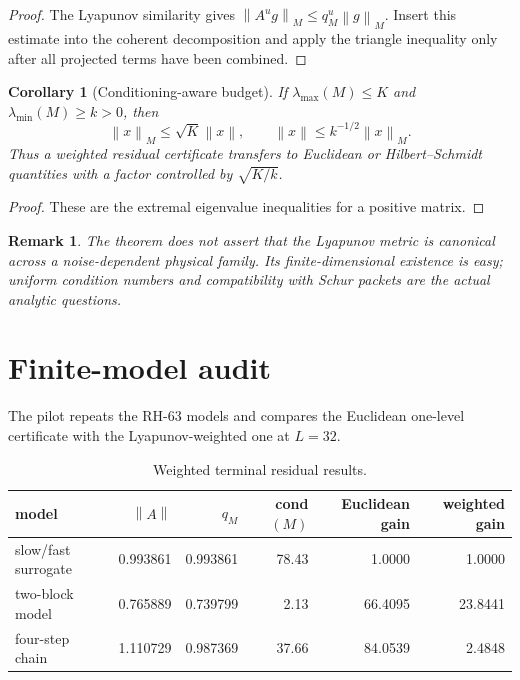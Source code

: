 \documentclass[11pt]{article}
\newtheorem{corollary}[theorem]{Corollary}
\newtheorem{remark}[theorem]{Remark}
\newcommand{\norm}[1]{\left\lVert#1\right\rVert}
\begin{document}
\begin{proof}
The Lyapunov similarity gives
$\norm{A^ug}_M\le q_M^u\norm g_M$.  Insert this estimate into the coherent
decomposition and apply the triangle inequality only after all projected
terms have been combined.
\end{proof}

\begin{corollary}[Conditioning-aware budget]
\label{cor:conditioning}
If $\lambda_{\max}(M)\le K$ and
$\lambda_{\min}(M)\ge k>0$, then
\[
 \norm{x}_M\le\sqrt K\norm x,
 \qquad
 \norm{x}\le k^{-1/2}\norm{x}_M.
\]
Thus a weighted residual certificate transfers to Euclidean or
Hilbert--Schmidt quantities with a factor controlled by
$\sqrt{K/k}$.
\end{corollary}

\begin{proof}
These are the extremal eigenvalue inequalities for a positive matrix.
\end{proof}

\begin{remark}
The theorem does not assert that the Lyapunov metric is canonical across a
noise-dependent physical family.  Its finite-dimensional existence is easy;
uniform condition numbers and compatibility with Schur packets are the
actual analytic questions.
\end{remark}

\section{Finite-model audit}
\label{sec:audit}

The pilot repeats the RH-63 models and compares the Euclidean one-level
certificate with the Lyapunov-weighted one at $L=32$.

\begin{table}[H]
\centering
\caption{Weighted terminal residual results.}
\label{tab:results}
\begin{tabular}{lrrrrr}
\toprule
model & $\norm A$ & $q_M$ & cond$(M)$ & Euclidean gain & weighted gain\\
\midrule
slow/fast surrogate & 0.993861 & 0.993861 & 78.43 & 1.0000 & 1.0000\\
two-block model     & 0.765889 & 0.739799 & 2.13  & 66.4095& 23.8441\\
four-step chain     & 1.110729 & 0.987369 & 37.66 & 84.0539& 2.4848\\
\bottomrule
\end{tabular}
\end{table}
\end{document}
